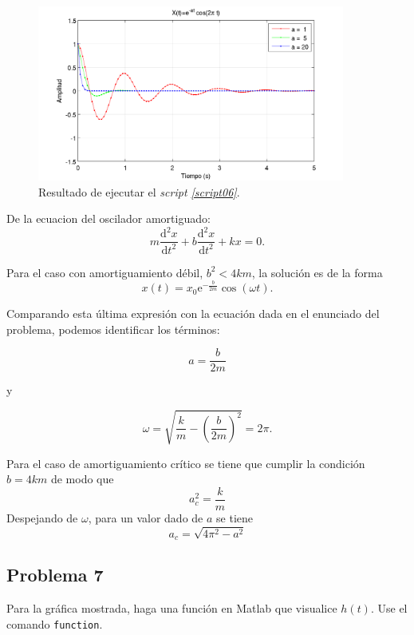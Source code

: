 \documentclass[a4paper,12pt,final]{article}
\begin{document}
      \begin{figure}[H]
        \caption{Resultado de ejecutar el \emph{script \ref{script06}}.}
        \label{script06figure}
        \includegraphics[width=0.9\textwidth]{./laboratorio_2/problema06.png}
      \end{figure}
      \vspace{\fill}
      \newpage
      \noindent De la ecuacion del oscilador amortiguado:
      $$ m \frac{\mathrm{d}^{2}x}{\mathrm{d}t^2} + b \frac{\mathrm{d}^{2}x}{\mathrm{d}t^2} + kx = 0. $$

      \noindent Para el caso con amortiguamiento débil, $b^2 < 4km$, la solución es de la forma
      $$ x\left(t\right) = x_0 \mathrm{e}^{-\frac{b}{2m}}\cos\left(\omega t\right). $$

      \noindent Comparando esta última expresión con la ecuación dada en
      el enunciado del problema, podemos identificar los términos:

      $$a = \frac{b}{2m}$$

      \noindent y

      $$\omega = \sqrt{\frac{k}{m} - \left(\frac{b}{2m}\right)^2} = 2\pi . $$

      \noindent Para el caso de amortiguamiento crítico se tiene que cumplir la
      condición $b = 4km$ de modo que
      $$ a^2_c = \frac{k}{m} $$
      \noindent Despejando de $\omega$, para un valor dado de $a$ se tiene
      $$ a_c = \sqrt{4\pi^2 - a^2} $$
      \vspace{\fill}

  \newpage
  \subsection*{Problema 7}
    \noindent Para la gráfica mostrada, haga una función en Matlab que
    visualice $h(t)$. Use el comando \texttt{function}.
\end{document}
